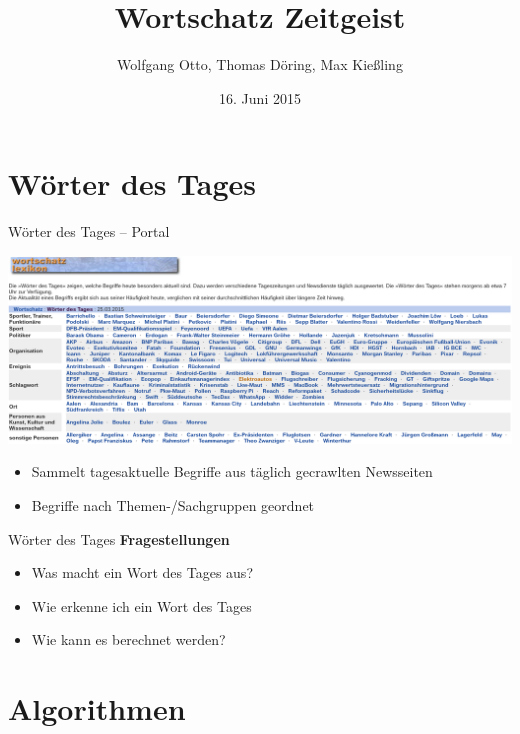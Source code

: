 \documentclass{beamer}
\author[Otto, Döring, Kiessling]{Wolfgang Otto, Thomas Döring, Max Kießling}
\title{Wortschatz Zeitgeist}
\institute{Seminar Anwendungen der linguistischen Informatik}
\date{16. Juni 2015}
\begin{document}
	
\watermarkoff

\begin{frame}[t,plain]
	\titlepage
\end{frame}

\section{Wörter des Tages}
\begin{frame} \sectionpage \end{frame}


\begin{frame}{Wörter des Tages – Portal}
	\begin{centering}
	  \includegraphics[width=1\textwidth]{pictures/woerter_des_tages_seite.png}
	\end{centering}
	\begin{itemize}
		\item Sammelt tagesaktuelle Begriffe aus täglich gecrawlten Newsseiten
		\item Begriffe nach Themen-/Sachgruppen geordnet
	\end{itemize}
\end{frame}

\begin{frame}{Wörter des Tages}
	\textbf{Fragestellungen}
	\begin{itemize}
		\item Was macht ein Wort des Tages aus?
		\item Wie erkenne ich ein Wort des Tages
		\item Wie kann es berechnet werden?
	\end{itemize}
\end{frame}


\section{Algorithmen}
\begin{frame} \sectionpage \end{frame}
\end{document}

